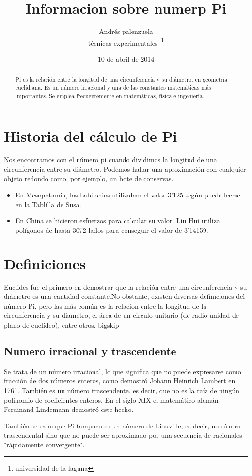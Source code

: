 \documentclass[spanish,a4paper,11pt]{article}
\begin{document}
\title{Informacion sobre numerp Pi}
\author{Andrés palenzuela \\
         técnicas experimentales~\footnote{universidad de la laguna}}
\date{10 de abril de 2014}
\maketitle
\begin{abstract}
Pi es la relación entre la longitud de una circunferencia y su diámetro, 
en geometría euclidiana. Es un número irracional y una de las constantes 
matemáticas más importantes. Se emplea frecuentemente en matemáticas, 
física e ingeniería.
\end{abstract}
\section{Historia del cálculo de Pi}
Nos encontramos con el número pi cuando dividimos la longitud de una circunferencia entre 
su diámetro. Podemos hallar una aproximación con cualquier objeto redondo como, por ejemplo, 
un bote de conservas.
\begin{itemize}
\item En Mesopotamia, los babilonios utilizaban el valor 3'125 según puede leerse en 
la Tablilla de Susa.
\item En China se hicieron esfuerzos para calcular su valor, Liu Hui utiliza polígonos 
de hasta 3072 lados para conseguir el valor de 3'14159. 
\end{itemize}
\section{Definiciones}
Euclides fue el primero en demostrar que la relación entre una circunferencia y su 
diámetro es una cantidad constante.No obstante, existen diversas definiciones del número Pi, 
pero las más común es la relacion entre la longitud de la circunferencia y su diametro, el 
área de un circulo unitario (de radio unidad de plano de euclídeo), entre otros.
bigskip
\subsection{Numero irracional y trascendente}
Se trata de un número irracional, lo que significa que no puede expresarse como fracción 
de dos números enteros, como demostró Johann Heinrich Lambert en 1761. También es un número 
trascendente, es decir, que no es la raíz de ningún polinomio de coeficientes enteros. En el 
siglo XIX el matemático alemán Ferdinand Lindemann demostró este hecho.\par
También se sabe que Pi tampoco es un número de Liouville, es decir, no sólo es trascendental 
sino que no puede ser aproximado por una secuencia de racionales "rápidamente convergente".
\end{document}
